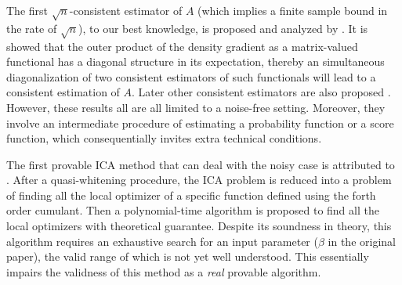 \documentclass[twoside]{article}
\theoremstyle{definition}
\begin{document}
The first  $\sqrt{n}$-consistent estimator of $A$ (which implies a finite sample bound in the rate of $\sqrt{n}$), to our best knowledge, is proposed and analyzed by \citet{samarov2004nonparametric}. 
It is showed that the outer product of the density gradient as a matrix-valued functional has a diagonal structure in its expectation, 
thereby an simultaneous diagonalization of two consistent estimators of such functionals will lead to a consistent estimation of $A$.
Later other consistent estimators are also proposed \citep{eriksson2003characteristic,chen2005consistent,chen2006efficient}.
However, these results all are all limited to a noise-free setting. 
Moreover, they involve an intermediate procedure of estimating a probability function or a score function, which consequentially invites extra technical conditions. 

The first provable ICA method that can deal with the noisy case is attributed to \citet{arora2012provable}. 
After a quasi-whitening procedure, the ICA problem is reduced into a problem of finding all the local optimizer of a specific function defined using the forth order cumulant. 
Then a polynomial-time algorithm is proposed to find all the local optimizers with theoretical guarantee.
Despite its soundness in theory, this algorithm requires an exhaustive search for an input parameter ($\beta$ in the original paper), the valid range of which is not yet well understood. This essentially impairs the validness of this method as a \emph{real} provable algorithm.
\end{document}
